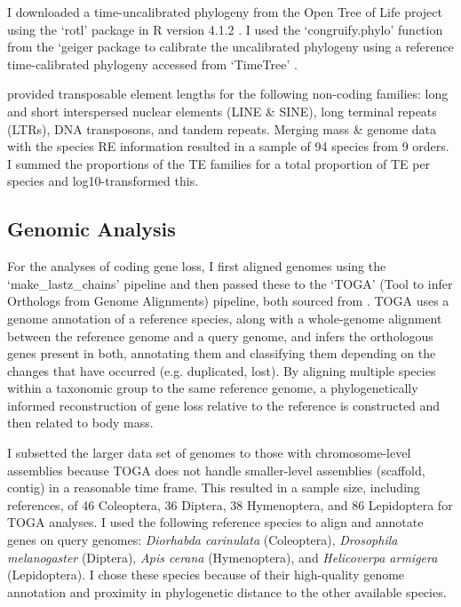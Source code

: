 \documentclass[11pt]{article}
\begin{document}
I downloaded a time-uncalibrated phylogeny from the Open Tree of Life project using the `rotl' package \citep{Michonneau2016-tx} in R version 4.1.2 \citep{R-citation}. I used the `congruify.phylo' function from the `geiger package \citep{congruify, geiger} to calibrate the uncalibrated phylogeny using a reference time-calibrated phylogeny accessed from `TimeTree' \citep{timetree}.

\cite{600TEs} provided transposable element lengths for the following non-coding families: long and short interspersed nuclear elements (LINE \& SINE), long terminal repeats (LTRs), DNA transposons, and tandem repeats. Merging mass \& genome data with the species RE information resulted in a sample of 94 species from 9 orders. I summed the proportions of the TE families for a total proportion of TE per species and log10-transformed this. 


\subsection{Genomic Analysis}
For the analyses of coding gene loss, I first aligned genomes using the `make\_lastz\_chains' pipeline and then passed these to the `TOGA' (Tool to infer Orthologs from Genome Alignments) pipeline, both sourced from \cite{TOGA}. TOGA uses a genome annotation of a reference species, along with a whole-genome alignment between the reference genome and a query genome, and infers the orthologous genes present in both, annotating them and classifying them depending on the changes that have occurred (e.g. duplicated, lost). By aligning multiple species within a taxonomic group to the same reference genome, a phylogenetically informed reconstruction of gene loss relative to the reference is constructed and then related to body mass. 

I subsetted the larger data set of genomes to those with chromosome-level assemblies because TOGA does not handle smaller-level assemblies (scaffold, contig) in a reasonable time frame. This resulted in a sample size, including references, of 46 Coleoptera,  36 Diptera, 38 Hymenoptera, and 86 Lepidoptera for TOGA analyses. I used the following reference species to align and annotate genes on query genomes: \textit{Diorhabda carinulata} (Coleoptera), \textit{Drosophila melanogaster} (Diptera), \textit{Apis cerana} (Hymenoptera), and \textit{Helicoverpa armigera} (Lepidoptera). I chose these species because of their high-quality genome annotation and proximity in phylogenetic distance to the other available species. 
\end{document}
